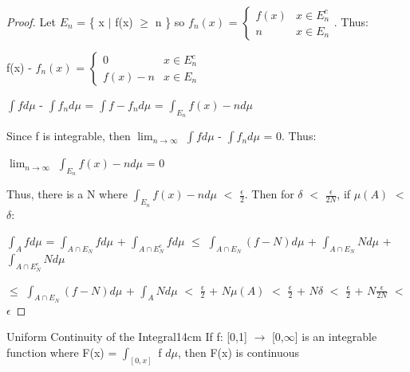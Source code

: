    \begin{proof}
        Let $E_n$ = \{ x $|$ f(x) $\geq$ n \}
        so $f_n(x)$
        = $\begin{cases}
            f(x) & x \in E_n^c \\
            n & x \in E_n
        \end{cases}$.
        Thus:
        
        \hspace{0.5cm}
        f(x) - $f_n(x)$
        = $\begin{cases}
            0 & x \in E_n^c \\
            f(x) - n & x \in E_n
        \end{cases}$

        \hspace{0.5cm}
        $\int f d\mu$ - $\int f_n d\mu$
        = $\int f-f_n d\mu$
        = $\int_{E_n} f(x)-n d\mu$

        Since f is integrable, then
        $\lim_{n \rightarrow \infty}$ $\int f d\mu$ - $\int f_n d\mu$ = 0. Thus:

        \hspace{0.5cm}
        $\lim_{n \rightarrow \infty}$ $\int_{E_n} f(x)-n d\mu$ = 0

        Thus, there is a N where
        $\int_{E_n} f(x)-n d\mu$ $<$ $\frac{\epsilon}{2}$.
        Then for $\delta$ $<$ $\frac{\epsilon}{2N}$, if $\mu(A)$ $<$ $\delta$:

        \hspace{0.5cm}
        $\int_A f d\mu$
        = $\int_{A \cap E_N} f d\mu$ + $\int_{A \cap E_N^c} f d\mu$
        $\leq$ $\int_{A \cap E_N} (f-N) d\mu$
                + $\int_{A \cap E_N} N d\mu$
                + $\int_{A \cap E_N^c} N d\mu$

        \hspace{1.9cm}
        $\leq$ $\int_{A \cap E_N} (f-N) d\mu$
                + $\int_A N d\mu$
        $<$ $\frac{\epsilon}{2}$ + $N\mu(A)$
        $<$ $\frac{\epsilon}{2}$ + $N\delta$
        $<$ $\frac{\epsilon}{2}$ + $N\frac{\epsilon}{2N}$
        $<$ $\epsilon$
    \end{proof}

    \vspace{0.5cm}



    \begin{corollary}{Uniform Continuity of the Integral}{14cm}
        If f: [0,1] $\rightarrow$ [0,$\infty$] is an integrable
        function where F(x) = $\int_{[0,x]}$ f $d\mu$, then F(x) is continuous
    \end{corollary}

